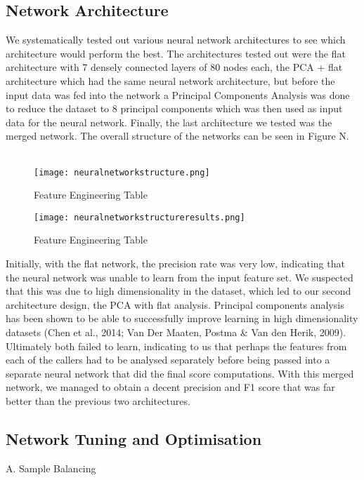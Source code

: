 \documentclass{article}
\begin{document}
\subsection{Network Architecture}
We systematically tested out various neural network architectures to see which architecture would perform the best. The architectures tested out were the flat architecture with 7 densely connected layers of 80 nodes each, the PCA + flat architecture which had the same neural network architecture, but before the input data was fed into the network a Principal Components Analysis was done to reduce the dataset to 8 principal components which was then used as input data for the neural network. Finally, the last architecture we tested was the merged network. The overall structure of the networks can be seen in Figure N. \\\\

\begin{figure}[H]
\caption{Feature Engineering Table}
\texttt{[image: neuralnetworkstructure.png]}
\centering
\end{figure}

\begin{figure}[H]
\caption{Feature Engineering Table}
\texttt{[image: neuralnetworkstructureresults.png]}
\centering
\end{figure}
Initially, with the flat network, the precision rate was very low, indicating that the neural network was unable to learn from the input feature set. We suspected that this was due to high dimensionality in the dataset, which led to our second architecture design, the PCA with flat analysis. Principal components analysis has been shown to be able to successfully improve learning in high dimensionality datasets (Chen et al., 2014; Van Der Maaten, Postma \& Van den Herik, 2009). Ultimately both failed to learn, indicating to us that perhaps the features from each of the callers had to be analysed separately before being passed into a separate neural network that did the final score computations. With this merged network, we managed to obtain a decent precision and F1 score that was far better than the previous two architectures. 


\subsection{Network Tuning and Optimisation}

A. Sample Balancing
\end{document}
